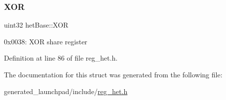 \subsubsection{\texorpdfstring{X\+OR}{XOR}}
{\footnotesize\ttfamily uint32 het\+Base\+::\+X\+OR}

0x0038\+: X\+OR share register 

Definition at line 86 of file reg\+\_\+het.\+h.



The documentation for this struct was generated from the following file\+:\begin{DoxyCompactItemize}
\item 
generated\+\_\+launchpad/include/\mbox{\hyperlink{reg__het_8h}{reg\+\_\+het.\+h}}\end{DoxyCompactItemize}
